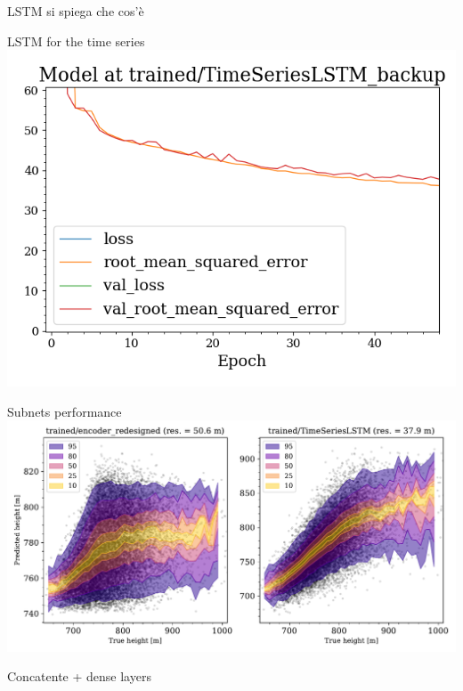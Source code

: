 \documentclass{beamer}
\begin{document}
\begin{frame}{LSTM}
si spiega che cos'è
    
\end{frame}

\begin{frame}{LSTM for the time series}
    \includegraphics[width=\textwidth]{LSTM_history.png}    
\end{frame}

\begin{frame}{Subnets performance}
    \includegraphics[width=\textwidth]{sub_net_train.pdf}
\end{frame}

\begin{frame}{Concatente + dense layers}

    
\end{frame}
\end{document}
